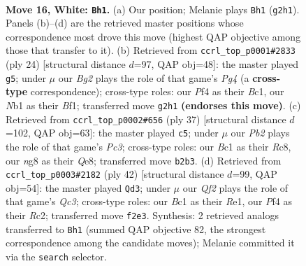 \documentclass[11pt]{article}
\begin{document}
\clearpage

\begin{figure}[p]\centering
\begin{subfigure}{0.46\textwidth}\centering
\resizebox{\linewidth}{!}{%
\newchessgame
\chessboard[
  setfen={2r1kbnr/pb1p1pp1/1q6/2p1P1Pp/2p2P1P/2P4R/PP3QB1/RNB1K3 w Qk - 2 16},
  showmover=false,
  pgfstyle=straightmove, color=movearrow, markmove={g2-h1}
]}
\caption{}
\end{subfigure}\hfill
\begin{subfigure}{0.46\textwidth}\centering
\resizebox{\linewidth}{!}{%
\newchessgame
\chessboard[
  setfen={r1bqk1nr/1p2ppb1/2p3p1/p6p/P1P3P1/1RNP3P/1P3P2/2BQKB1R w Kkq - 0 13},
  showmover=false,
  pgfstyle=straightmove, color=movearrow, markmove={g4-g5}
]}
\caption{}
\end{subfigure}
\\[4pt]
\begin{subfigure}{0.46\textwidth}\centering
\resizebox{\linewidth}{!}{%
\newchessgame
\chessboard[
  setfen={2r1qr2/p2n2pk/1pp1p2p/3b1p2/1P1P1P2/P2Q1P2/3NP1BP/2RR2K1 b - - 0 19},
  showmover=false,
  pgfstyle=straightmove, color=movearrow, markmove={c6-c5}
]}
\caption{}
\end{subfigure}\hfill
\begin{subfigure}{0.46\textwidth}\centering
\resizebox{\linewidth}{!}{%
\newchessgame
\chessboard[
  setfen={2r3k1/1b1nr1pp/1ppq4/p2p1p2/3P1N1P/1PQ2PP1/P1R1P1B1/4R1K1 w - - 1 22},
  showmover=false,
  pgfstyle=straightmove, color=movearrow, markmove={c3-d3}
]}
\caption{}
\end{subfigure}
\caption{\textbf{Move 16, White: \texttt{Bh1}.} (a) Our position; Melanie plays \texttt{Bh1} (\texttt{g2h1}). Panels (b)--(d) are the retrieved master positions whose correspondence most drove this move (highest QAP objective among those that transfer to it). (b) Retrieved from \texttt{ccrl\_top\_p0001\#2833} (ply 24) [structural distance $d$=97, QAP obj=48]: the master played \texttt{g5}; under $\mu$ our \emph{Bg2} plays the role of that game's \emph{Pg4} (a \textbf{cross-type} correspondence); cross-type roles: our \emph{P}f4 as their \emph{B}c1, our \emph{N}b1 as their \emph{B}f1; transferred move \texttt{g2h1} \textbf{(endorses this move)}. (c) Retrieved from \texttt{ccrl\_top\_p0002\#656} (ply 37) [structural distance $d$=102, QAP obj=63]: the master played \texttt{c5}; under $\mu$ our \emph{Pb2} plays the role of that game's \emph{Pc3}; cross-type roles: our \emph{B}c1 as their \emph{R}c8, our \emph{n}g8 as their \emph{Q}e8; transferred move \texttt{b2b3}. (d) Retrieved from \texttt{ccrl\_top\_p0003\#2182} (ply 42) [structural distance $d$=99, QAP obj=54]: the master played \texttt{Qd3}; under $\mu$ our \emph{Qf2} plays the role of that game's \emph{Qc3}; cross-type roles: our \emph{B}c1 as their \emph{R}e1, our \emph{P}f4 as their \emph{R}c2; transferred move \texttt{f2e3}. Synthesis: 2 retrieved analogs transferred to \texttt{Bh1} (summed QAP objective 82, the strongest correspondence among the candidate moves); Melanie committed it via the \texttt{search} selector.}
\label{fig:thought-m30}
\end{figure}
\end{document}

